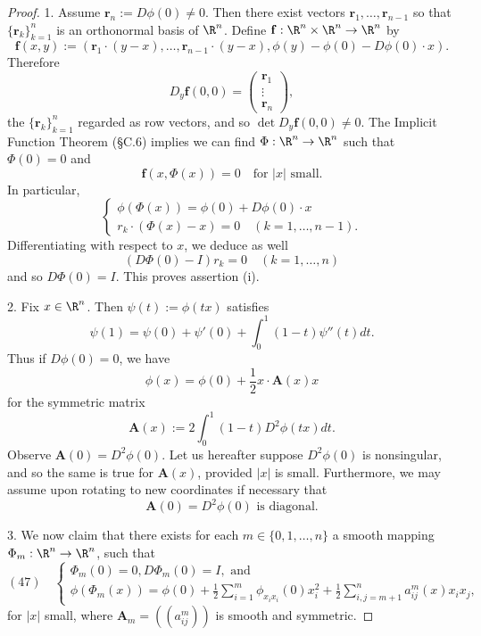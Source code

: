 \begin{proof}
1. Assume $\mathbf{r}_n := D\phi(0) \neq 0$. Then there exist vectors $\mathbf{r}_1, \ldots, \mathbf{r}_{n-1}$ so that $\{\mathbf{r}_k\}_{k=1}^n$ is an orthonormal basis of $\R^n$. Define $\mathbf{f} : \R^n \times \R^n \to \R^n$ by
$$\mathbf{f}(x,y) := (\mathbf{r}_1 \cdot (y-x), \ldots, \mathbf{r}_{n-1} \cdot (y-x), \phi(y) - \phi(0) - D\phi(0) \cdot x).$$
Therefore
$$D_y \mathbf{f}(0,0) = \begin{pmatrix} \mathbf{r}_1 \\ \vdots \\ \mathbf{r}_n \end{pmatrix},$$
the $\{\mathbf{r}_k\}_{k=1}^n$ regarded as row vectors, and so $\det D_y \mathbf{f}(0,0) \neq 0$. The Implicit Function Theorem (\S C.6) implies we can find $\Phi : \R^n \to \R^n$ such that $\Phi(0) = 0$ and
$$\mathbf{f}(x, \Phi(x)) = 0 \quad \text{for } |x| \text{ small}.$$
In particular,
$$\begin{cases}
\phi(\Phi(x)) = \phi(0) + D\phi(0) \cdot x \\
r_k \cdot (\Phi(x) - x) = 0 \quad (k = 1, \ldots, n-1).
\end{cases}$$
Differentiating with respect to $x$, we deduce as well
$$(D\Phi(0) - I)r_k = 0 \quad (k = 1,\ldots,n)$$
and so $D\Phi(0) = I$. This proves assertion (i).

2. Fix $x \in \R^n$. Then $\psi(t) := \phi(tx)$ satisfies
$$\psi(1) = \psi(0) + \psi'(0) + \int_0^1 (1-t)\psi''(t) dt.$$
Thus if $D\phi(0) = 0$, we have
$$\phi(x) = \phi(0) + \frac{1}{2} x \cdot \mathbf{A}(x)x$$
for the symmetric matrix
$$\mathbf{A}(x) := 2 \int_0^1 (1-t)D^2\phi(tx) dt.$$
Observe $\mathbf{A}(0) = D^2\phi(0)$. Let us hereafter suppose $D^2\phi(0)$ is nonsingular, and so the same is true for $\mathbf{A}(x)$, provided $|x|$ is small. Furthermore, we may assume upon rotating to new coordinates if necessary that
$$\mathbf{A}(0) = D^2\phi(0) \text{ is diagonal.}$$

3. We now claim that there exists for each $m \in \{0,1,\ldots,n\}$ a smooth mapping $\Phi_m : \R^n \to \R^n$, such that
$$(47) \quad \begin{cases}
\Phi_m(0) = 0, D\Phi_m(0) = I, \text{ and} \\
\phi(\Phi_m(x)) = \phi(0) + \frac{1}{2}\sum_{i=1}^m \phi_{x_i x_i}(0)x_i^2 + \frac{1}{2}\sum_{i,j=m+1}^n a_{ij}^m(x)x_i x_j,
\end{cases}$$
for $|x|$ small, where $\mathbf{A}_m = ((a_{ij}^m))$ is smooth and symmetric.


\end{proof}
